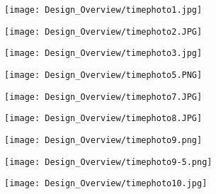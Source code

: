 \begin{multicols}{2}
\begin{tikzpicture}
\end{tikzpicture}

\columnbreak

\raggedleft
\begin{center}
        \texttt{[image: Design\_Overview/timephoto1.jpg]}
\end{center}
\begin{center}
        \texttt{[image: Design\_Overview/timephoto2.JPG]}
\end{center}
\begin{center}
        \texttt{[image: Design\_Overview/timephoto3.jpg]}
\end{center}
\begin{center}
        \texttt{[image: Design\_Overview/timephoto5.PNG]}
\end{center}
\begin{center}
        \texttt{[image: Design\_Overview/timephoto7.JPG]}
\end{center}
\begin{center}
        \texttt{[image: Design\_Overview/timephoto8.JPG]}
\end{center}
\begin{center}
        \texttt{[image: Design\_Overview/timephoto9.png]}
\end{center}
\begin{center}
        \texttt{[image: Design\_Overview/timephoto9-5.png]}
\end{center}
\begin{center}
        \texttt{[image: Design\_Overview/timephoto10.jpg]}
\end{center}

\end{multicols}